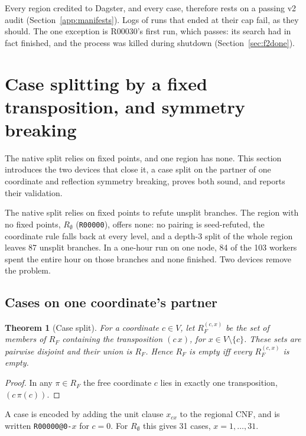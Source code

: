 \documentclass[11pt,a4paper]{article}
\newtheorem{theorem}{Theorem}
\theoremstyle{definition}
\newcommand{\code}[1]{\texttt{#1}}
\begin{document}
Every region credited to Dagster, and every case, therefore rests on a passing v2 audit
(Section~\ref{app:manifests}).
Logs of runs that ended at their cap fail, as they should. The one exception is R00030's first
run, which passes: its search had in fact finished, and the process was killed during shutdown
(Section~\ref{sec:f2done}).



\section{Case splitting by a fixed transposition, and symmetry breaking}\label{sec:cases}
The native split relies on fixed points, and one region has none. This section introduces the two devices that close it, a case split on the partner of one coordinate and reflection symmetry breaking, proves both sound, and reports their validation.


The native split relies on fixed points to refute unsplit branches. The region with no fixed
points, $R_\emptyset$ (\code{R00000}), offers none: no pairing is seed-refuted, the coordinate
rule falls back at every level, and a depth-3 split of the whole region leaves 87 unsplit
branches. In a one-hour run on one node, 84 of the 103 workers spent the entire hour on those
branches and none finished. Two devices remove the problem.

\subsection{Cases on one coordinate's partner}

\begin{theorem}[Case split]\label{thm:case}
For a coordinate $c\in V$, let $R_F^{(c,x)}$ be the set of members of $R_F$ containing the
transposition $(c\,x)$, for $x\in V\setminus\{c\}$. These sets are pairwise disjoint and their
union is $R_F$. Hence $R_F$ is empty iff every $R_F^{(c,x)}$ is empty.
\end{theorem}
\begin{proof}
In any $\pi\in R_F$ the free coordinate $c$ lies in exactly one transposition, $(c\,\pi(c))$.
\end{proof}

A case is encoded by adding the unit clause $x_{cx}$ to the regional CNF, and is written
\code{R00000@0-}$x$ for $c=0$. For $R_\emptyset$ this gives 31 cases, $x=1,\dots,31$.
\end{document}
